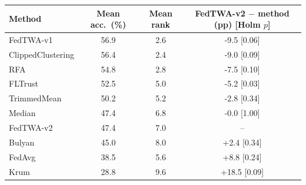 \begin{tabular}{lccc}
\toprule
Method & Mean acc.\ (\%) & Mean rank & FedTWA-v2 $-$ method (pp) [Holm $p$]\\
\midrule
FedTWA-v1 & 56.9 & 2.6 & -9.5 [0.06]\\
ClippedClustering & 56.4 & 2.4 & -9.0 [0.09]\\
RFA & 54.8 & 2.8 & -7.5 [0.10]\\
FLTrust & 52.5 & 5.0 & -5.2 [0.03]\\
TrimmedMean & 50.2 & 5.2 & -2.8 [0.34]\\
Median & 47.4 & 6.8 & -0.0 [1.00]\\
FedTWA-v2 & 47.4 & 7.0 & --\\
Bulyan & 45.0 & 8.0 & +2.4 [0.34]\\
FedAvg & 38.5 & 5.6 & +8.8 [0.24]\\
Krum & 28.8 & 9.6 & +18.5 [0.09]\\
\bottomrule
\end{tabular}

